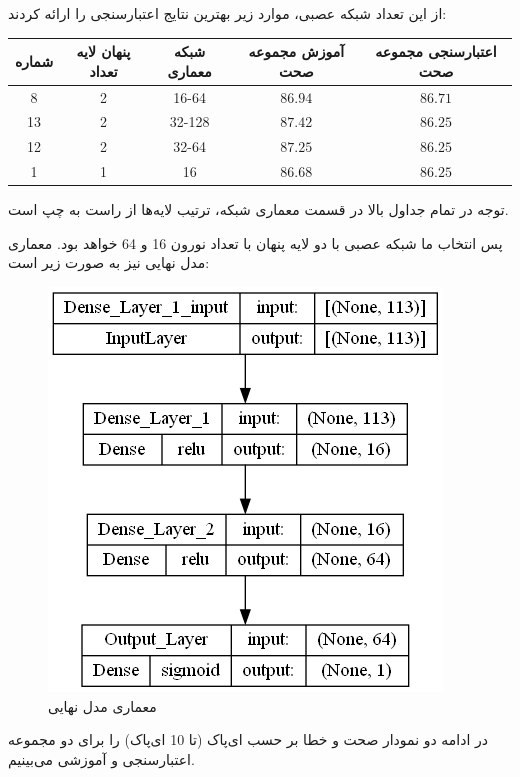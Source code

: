 \documentclass{article}
\begin{document}
از این تعداد شبکه عصبی، موارد زیر بهترین نتایج اعتبارسنجی را ارائه کردند:

\begin{longtable}{|c|c|c|c|c|}
    \hline
    شماره             & پنهان لایه تعداد & شبکه معماری & آموزش مجموعه صحت & اعتبارسنجی مجموعه صحت \\ \hline
    8 & 2 & 16-64  & $86.94$ & $86.71$ \\ \hline
    13 & 2 & 32-128  & $87.42$ & $86.25$ \\ \hline
    12 & 2 & 32-64  & $87.25$ & $86.25$ \\ \hline
    1 & 1 & 16  & $86.68$ & $86.25$ \\ \hline

\end{longtable}

توجه در تمام جداول بالا در قسمت معماری شبکه، ترتیب لایه‌ها از راست به چپ است.

پس انتخاب ما شبکه عصبی با دو لایه پنهان با تعداد نورون 16 و 64 خواهد بود. معماری مدل نهایی نیز به صورت زیر است:


\begin{figure}[!h]
    \centering\includegraphics[scale=.55]{./p3-3}
    \caption{معماری مدل نهایی}\label{fig.33}
\end{figure}

در ادامه دو نمودار صحت و خطا بر حسب ای‌پاک (تا 10 ای‌پاک) را برای دو مجموعه اعتبارسنجی و آموزشی می‌بینیم.
\end{document}
